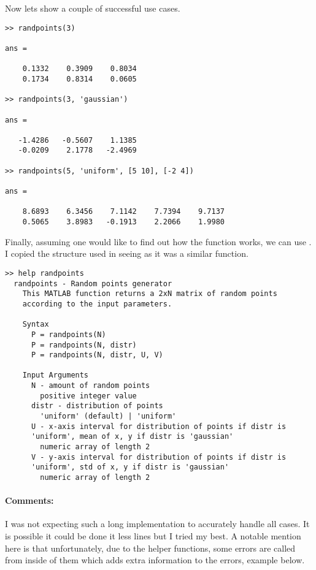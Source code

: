 Now lets show a couple of successful use cases.

\begin{verbatim}
>> randpoints(3)

ans =

    0.1332    0.3909    0.8034
    0.1734    0.8314    0.0605

>> randpoints(3, 'gaussian')

ans =

   -1.4286   -0.5607    1.1385
   -0.0209    2.1778   -2.4969

>> randpoints(5, 'uniform', [5 10], [-2 4])

ans =

    8.6893    6.3456    7.1142    7.7394    9.7137
    0.5065    3.8983   -0.1913    2.2066    1.9980
\end{verbatim}

Finally, assuming one would like to find out how the function works, we can use .
I copied the structure used in  seeing as it was a similar function.

\begin{verbatim}
>> help randpoints
  randpoints - Random points generator
    This MATLAB function returns a 2xN matrix of random points
    according to the input parameters.
 
    Syntax
      P = randpoints(N)
      P = randpoints(N, distr)
      P = randpoints(N, distr, U, V)
 
    Input Arguments
      N - amount of random points
        positive integer value
      distr - distribution of points
        'uniform' (default) | 'uniform'
      U - x-axis interval for distribution of points if distr is
      'uniform', mean of x, y if distr is 'gaussian'
        numeric array of length 2
      V - y-axis interval for distribution of points if distr is
      'uniform', std of x, y if distr is 'gaussian'
        numeric array of length 2
\end{verbatim}


\paragraph{Comments:}
I was not expecting such a long implementation to accurately handle all cases.
It is possible it could be done it less lines but I tried my best.
A notable mention here is that unfortunately, due to the helper functions, some errors are called from inside of them which adds extra information to the errors, example below. 

